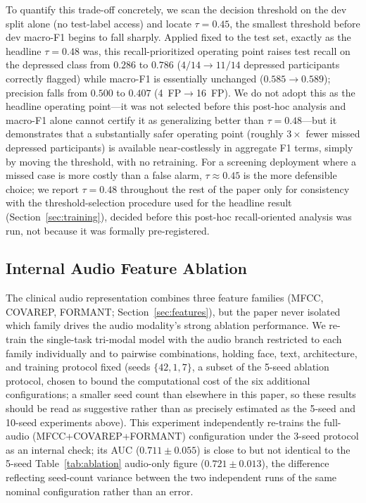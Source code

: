 \documentclass[5p,twocolumn]{elsarticle}
\begin{document}
To quantify this trade-off concretely, we scan the decision threshold
on the dev split alone (no test-label access) and locate
$\tau{=}0.45$, the smallest threshold before dev macro-F1 begins to
fall sharply. Applied fixed to the test set, exactly as the headline
$\tau{=}0.48$ was, this recall-prioritized operating point raises
test recall on the depressed class from $0.286$ to $0.786$
($4/14\to11/14$ depressed participants correctly flagged) while
macro-F1 is essentially unchanged ($0.585\to0.589$); precision falls
from $0.500$ to $0.407$ (4~FP$\to$16~FP). We do not adopt this as the
headline operating point---it was not selected before this
post-hoc analysis and macro-F1 alone cannot certify it as
generalizing better than $\tau{=}0.48$---but it demonstrates that a
substantially safer operating point (roughly $3\times$ fewer missed
depressed participants) is available near-costlessly in aggregate
F1 terms, simply by moving the threshold, with no retraining. For a
screening deployment where a missed case is more costly than a false
alarm, $\tau{\approx}0.45$ is the more defensible choice; we report
$\tau{=}0.48$ throughout the rest of the paper only for consistency
with the threshold-selection procedure used for the headline result
(Section~\ref{sec:training}), decided before this post-hoc
recall-oriented analysis was run, not because it was formally
pre-registered.

\subsection{Internal Audio Feature Ablation}
\label{sec:audio_ablation}

The clinical audio representation combines three feature families
(MFCC, COVAREP, FORMANT; Section~\ref{sec:features}), but the paper
never isolated which family drives the audio modality's strong
ablation performance. We re-train the single-task tri-modal model
with the audio branch restricted to each family individually and to
pairwise combinations, holding face, text, architecture, and training
protocol fixed (seeds $\{42,1,7\}$, a subset of the 5-seed ablation
protocol, chosen to bound the computational cost of the six additional
configurations; a smaller seed count than elsewhere in this paper, so
these results should be read as suggestive rather than as precisely
estimated as the 5-seed and 10-seed experiments above). This
experiment independently re-trains the full-audio (MFCC+COVAREP+FORMANT)
configuration under the 3-seed protocol as an internal check; its
AUC ($0.711\pm0.055$) is close to but not identical to the 5-seed
Table~\ref{tab:ablation} audio-only figure ($0.721\pm0.013$), the
difference reflecting seed-count variance between the two independent
runs of the same nominal configuration rather than an error.
\end{document}

